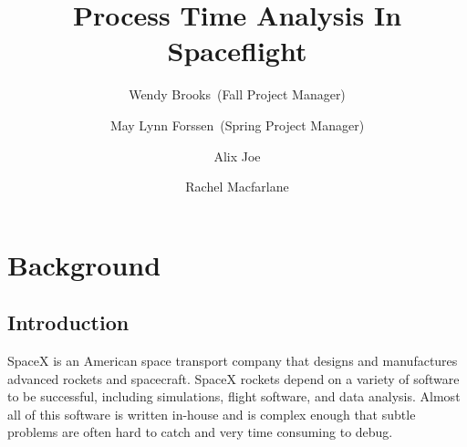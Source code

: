 \documentclass{hmcclinic}
\title{Process Time Analysis In Spaceflight}
\author{Wendy Brooks~(Fall Project Manager) \and May Lynn Forssen~(Spring Project Manager) \and Alix Joe \and
Rachel Macfarlane}
\begin{document}

\maketitle
 
\tableofcontents



\chapter{Background} %
\section{Introduction}

SpaceX is an American space transport company that designs and manufactures
advanced rockets and spacecraft. SpaceX rockets depend on a variety of software
to be successful, including simulations, flight software, and data analysis.
Almost all of this software is written in-house and is complex enough that subtle
problems are often hard to catch and very time consuming to debug.

\end{document}
